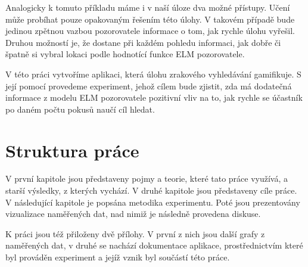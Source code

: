 Analogicky k tomuto příkladu máme i v naší úloze dva možné přístupy.
Učení může probíhat pouze opakovaným řešením této úlohy. V takovém případě bude
jedinou zpětnou vazbou pozorovatele informace o tom, jak rychle úlohu vyřešil. Druhou možností je,
že dostane při každém pohledu informaci, jak dobře či špatně si vybral lokaci podle
hodnotící funkce ELM pozorovatele.

V této práci vytvoříme aplikaci, která úlohu zrakového vyhledávání gamifikuje. S její pomocí provedeme experiment, jehož cílem bude zjistit, zda má dodatečná informace z modelu ELM pozorovatele pozitivní vliv na to, jak rychle se účastník po daném počtu pokusů naučí cíl hledat.




\section*{Struktura práce}

V první kapitole jsou představeny pojmy a teorie, které tato
práce využívá, a starší výsledky, z kterých vychází. V druhé kapitole jsou představeny cíle práce. V následující
kapitole je popsána metodika experimentu. Poté jsou prezentovány vizualizace
naměřených dat, nad nimiž je následně provedena diskuse. 

K práci jsou též
přiloženy dvě přílohy. V první z nich jsou další grafy z naměřených dat, v
druhé se nachází dokumentace aplikace, prostřednictvím které byl prováděn
experiment a jejíž vznik byl součástí této práce.

